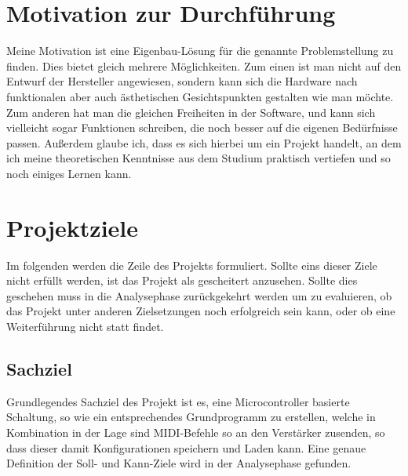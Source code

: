 \documentclass[10pt,a4paper]{report}
\begin{document}
\section{Motivation zur Durchführung}

\begin{flushleft}


Meine Motivation ist eine Eigenbau-Lösung für die genannte Problemstellung zu finden. Dies bietet gleich mehrere Möglichkeiten. Zum einen ist man nicht auf den Entwurf der Hersteller angewiesen, sondern kann sich die Hardware nach funktionalen aber auch ästhetischen Gesichtspunkten gestalten wie man möchte. Zum anderen hat man die gleichen Freiheiten in der Software, und kann sich vielleicht sogar Funktionen schreiben, die noch besser auf die eigenen Bedürfnisse passen. Außerdem glaube ich, dass es sich hierbei um ein Projekt handelt, an dem ich meine theoretischen Kenntnisse aus dem Studium praktisch vertiefen und so noch einiges Lernen kann.

\end{flushleft}
\section{Projektziele}

\begin{flushleft}

Im folgenden werden die Zeile des Projekts formuliert. Sollte eins dieser Ziele nicht erfüllt werden, ist das Projekt als gescheitert anzusehen. Sollte dies geschehen muss in die Analysephase zurückgekehrt werden um zu evaluieren, ob das Projekt unter anderen Zielsetzungen noch erfolgreich sein kann, oder ob eine Weiterführung nicht statt findet.

\end{flushleft}

\subsection{Sachziel}
\begin{flushleft}

Grundlegendes Sachziel des Projekt ist es, eine Microcontroller basierte Schaltung, so wie ein entsprechendes Grundprogramm zu erstellen, welche in Kombination in der Lage sind MIDI-Befehle so an den Verstärker zusenden, so dass dieser damit Konfigurationen speichern und Laden kann. Eine genaue Definition der Soll- und Kann-Ziele wird in der Analysephase gefunden. 
\end{flushleft}
\end{document}
